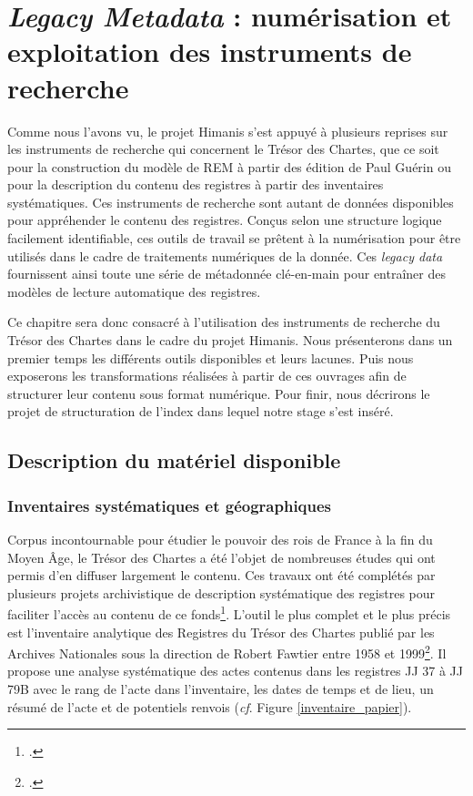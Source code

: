 \documentclass[a4paper,12pt,twoside]{book}
\begin{document}
	
	\chapter{\textit{Legacy Metadata} : numérisation et exploitation des instruments de recherche}
	
	Comme nous l'avons vu, le projet Himanis s'est appuyé à plusieurs reprises sur les instruments de recherche qui concernent le Trésor des Chartes, que ce soit pour la construction du modèle de REM à partir des édition de Paul Guérin ou pour la description du contenu des registres à partir des inventaires systématiques. Ces instruments de recherche sont autant de données disponibles pour appréhender le contenu des registres. Conçus selon une structure logique facilement identifiable, ces outils de travail se prêtent à la numérisation pour être utilisés dans le cadre de traitements numériques de la donnée. Ces \textit{legacy data} fournissent ainsi toute une série de métadonnée clé-en-main pour entraîner des modèles de lecture automatique des registres.
	
	Ce chapitre sera donc consacré à l'utilisation des instruments de recherche du Trésor des Chartes dans le cadre du projet Himanis. Nous présenterons dans un premier temps les différents outils disponibles et leurs lacunes. Puis nous exposerons les transformations réalisées à partir de ces ouvrages afin de structurer leur contenu sous format numérique. Pour finir, nous décrirons le projet de structuration de l'index dans lequel notre stage s'est inséré.
	
	\section{Description du matériel disponible}
	
	\subsection{Inventaires systématiques et géographiques}
	
	Corpus incontournable pour étudier le pouvoir des rois de France à la fin du Moyen Âge, le Trésor des Chartes a été l'objet de nombreuses études qui ont permis d'en diffuser largement le contenu. Ces travaux ont été complétés par plusieurs projets archivistique de description systématique des registres pour faciliter l'accès au contenu de ce fonds\footcite{stutzmann_recherche_2017}. L'outil le plus complet et le plus précis est l'inventaire analytique des Registres du Trésor des Chartes publié par les Archives Nationales sous la direction de Robert Fawtier entre 1958 et 1999\footcite{glenisson_registres_1958}. Il propose une analyse systématique des actes contenus dans les registres JJ 37 à JJ 79B avec le rang de l'acte dans l'inventaire, les dates de temps et de lieu, un résumé de l'acte et de potentiels renvois (\textit{cf}. Figure \ref{inventaire_papier}).
	
\end{document}
